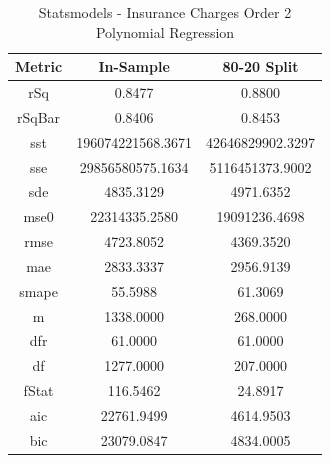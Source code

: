 \documentclass{article}
\begin{document}
\begin{table}[H]
\centering
\caption{Statsmodels - Insurance Charges Order 2 Polynomial Regression}
\label{tab:Statsmodels - Insurance Charges Order 2 Polynomial Regression}
\begin{tabular}{|c|c|c|}\hline
Metric & In-Sample & 80-20 Split \\ \hline \hline
rSq & 0.8477 & 0.8800 \\ \hline
rSqBar & 0.8406 & 0.8453 \\ \hline
sst & 196074221568.3671 & 42646829902.3297 \\ \hline
sse & 29856580575.1634 & 5116451373.9002 \\ \hline
sde & 4835.3129 & 4971.6352 \\ \hline
mse0 & 22314335.2580 & 19091236.4698 \\ \hline
rmse & 4723.8052 & 4369.3520 \\ \hline
mae & 2833.3337 & 2956.9139 \\ \hline
smape & 55.5988 & 61.3069 \\ \hline
m & 1338.0000 & 268.0000 \\ \hline
dfr & 61.0000 & 61.0000 \\ \hline
df & 1277.0000 & 207.0000 \\ \hline
fStat & 116.5462 & 24.8917 \\ \hline
aic & 22761.9499 & 4614.9503 \\ \hline
bic & 23079.0847 & 4834.0005 \\ \hline
\end{tabular}
\end{table}
\end{document}
